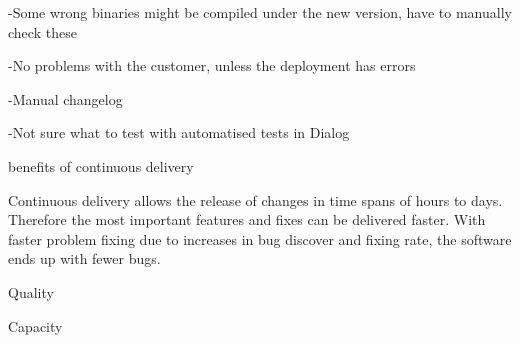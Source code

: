 \documentclass[english]{tktltiki2}
\theoremstyle{definition}
\theoremstyle{remark}
\begin{document}
-Some wrong binaries might be compiled under the new version, have to manually check these

-No problems with the customer, unless the deployment has errors

-Manual changelog

-Not sure what to test with automatised tests in Dialog


benefits of continuous delivery

Continuous delivery allows the release of changes in time spans of hours to days. Therefore the most important features and fixes can be delivered faster. With faster problem fixing due to increases in bug discover and fixing rate, the software ends up with fewer bugs. 

Quality

Capacity
\end{document}

